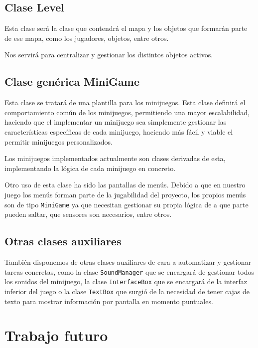 \documentclass[12pt, spanish]{article}
\begin{document}
\subsection{Clase Level}

Esta clase será la clase que contendrá el mapa y los objetos que formarán parte de ese mapa, como los jugadores, objetos, entre otros.

Nos servirá para centralizar y gestionar los distintos objetos activos.

\subsection{Clase genérica MiniGame}

Esta clase se tratará de una plantilla para los minijuegos. Esta clase definirá el comportamiento común de los minijuegos, permitiendo una mayor escalabilidad, haciendo que el implementar un minijuego sea simplemente gestionar las características específicas de cada minijuego, haciendo más fácil y viable el permitir minijuegos personalizados.

Los minijuegos implementados actualmente son clases derivadas de esta, implementando la lógica de cada minijuego en concreto.

Otro uso de esta clase ha sido las pantallas de menús. Debido a que en nuestro juego los menús forman parte de la jugabilidad del proyecto, los propios menús son de tipo \texttt{MiniGame} ya que necesitan gestionar su propia lógica de a que parte pueden saltar, que sensores son necesarios, entre otros.


\subsection{Otras clases auxiliares}

También disponemos de otras clases auxiliares de cara a automatizar y gestionar tareas concretas, como la clase \texttt{SoundManager} que se encargará de gestionar todos los sonidos del minijuego, la clase \texttt{InterfaceBox} que se encargará de la interfaz inferior del juego o la clase \texttt{TextBox} que surgió de la necesidad de tener cajas de texto para mostrar información por pantalla en momento puntuales.


\section*{Trabajo futuro}
\label{sec:futuro}
\end{document}

